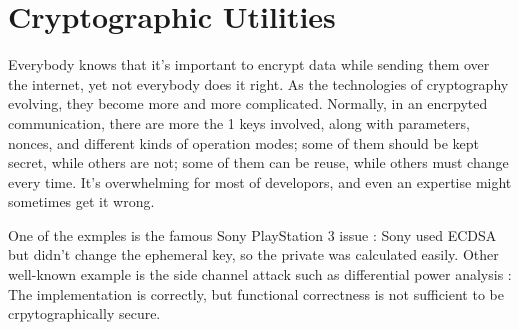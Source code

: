 \documentclass[conference]{IEEEtran}
\begin{document}






\section{Cryptographic Utilities}
Everybody knows that it's important to encrypt data while sending them over the internet,
yet not everybody does it right.
As the technologies of cryptography evolving,
they become more and more complicated.
Normally, in an encrpyted communication, there are more the 1 keys involved,
along with parameters, nonces, and different kinds of operation modes;
some of them should be kept secret, while others are not;
some of them can be reuse, while others must change every time.
It's overwhelming for most of developors, and even an expertise might sometimes get it wrong.

One of the exmples is the famous Sony PlayStation 3 issue \cite{PS3_Jailbreak}:
Sony used ECDSA \cite{ECDSA} but didn't change the ephemeral key, so the
private was calculated easily.
Other well-known example is the
side channel attack such as differential power analysis \cite{differential}:
The implementation is correctly, but functional correctness is not sufficient to
be crpytographically secure.
\end{document}
